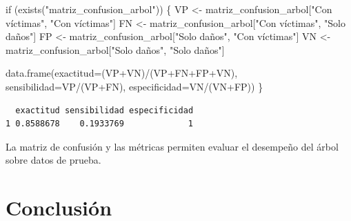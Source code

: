\documentclass[
  spanish,
  11pt,
  letterpaper,
]{book}
\newenvironment{Shaded}{}{}
\newcommand{\AttributeTok}[1]{\textcolor[rgb]{0.84,0.23,0.29}{#1}}
\newcommand{\ControlFlowTok}[1]{\textcolor[rgb]{0.84,0.23,0.29}{#1}}
\newcommand{\FunctionTok}[1]{\textcolor[rgb]{0.44,0.26,0.76}{#1}}
\newcommand{\NormalTok}[1]{\textcolor[rgb]{0.14,0.16,0.18}{#1}}
\newcommand{\OtherTok}[1]{\textcolor[rgb]{0.44,0.26,0.76}{#1}}
\newcommand{\SpecialCharTok}[1]{\textcolor[rgb]{0.00,0.36,0.77}{#1}}
\newcommand{\StringTok}[1]{\textcolor[rgb]{0.01,0.18,0.38}{#1}}
\begin{document}
\begin{Shaded}
\begin{Highlighting}[]
\ControlFlowTok{if}\NormalTok{ (}\FunctionTok{exists}\NormalTok{(}\StringTok{"matriz\_confusion\_arbol"}\NormalTok{)) \{}
\NormalTok{  VP }\OtherTok{\textless{}{-}}\NormalTok{ matriz\_confusion\_arbol[}\StringTok{"Con víctimas"}\NormalTok{, }\StringTok{"Con víctimas"}\NormalTok{]}
\NormalTok{  FN }\OtherTok{\textless{}{-}}\NormalTok{ matriz\_confusion\_arbol[}\StringTok{"Con víctimas"}\NormalTok{, }\StringTok{"Solo daños"}\NormalTok{]}
\NormalTok{  FP }\OtherTok{\textless{}{-}}\NormalTok{ matriz\_confusion\_arbol[}\StringTok{"Solo daños"}\NormalTok{, }\StringTok{"Con víctimas"}\NormalTok{]}
\NormalTok{  VN }\OtherTok{\textless{}{-}}\NormalTok{ matriz\_confusion\_arbol[}\StringTok{"Solo daños"}\NormalTok{, }\StringTok{"Solo daños"}\NormalTok{]}

  \FunctionTok{data.frame}\NormalTok{(}\AttributeTok{exactitud=}\NormalTok{(VP}\SpecialCharTok{+}\NormalTok{VN)}\SpecialCharTok{/}\NormalTok{(VP}\SpecialCharTok{+}\NormalTok{FN}\SpecialCharTok{+}\NormalTok{FP}\SpecialCharTok{+}\NormalTok{VN), }\AttributeTok{sensibilidad=}\NormalTok{VP}\SpecialCharTok{/}\NormalTok{(VP}\SpecialCharTok{+}\NormalTok{FN), }\AttributeTok{especificidad=}\NormalTok{VN}\SpecialCharTok{/}\NormalTok{(VN}\SpecialCharTok{+}\NormalTok{FP))}
\NormalTok{\}}
\end{Highlighting}
\end{Shaded}

\begin{verbatim}
  exactitud sensibilidad especificidad
1 0.8588678    0.1933769             1
\end{verbatim}

\begin{tcolorbox}[enhanced jigsaw, arc=.35mm, bottomrule=.15mm, bottomtitle=1mm, breakable, colback=white, colbacktitle=quarto-callout-tip-color!10!white, colframe=quarto-callout-tip-color-frame, coltitle=black, left=2mm, leftrule=.75mm, opacityback=0, opacitybacktitle=0.6, rightrule=.15mm, title=\textcolor{quarto-callout-tip-color}{\faLightbulb}\hspace{0.5em}{Interpretación del resultado}, titlerule=0mm, toprule=.15mm, toptitle=1mm]

La matriz de confusión y las métricas permiten evaluar el desempeño del
árbol sobre datos de prueba.

\end{tcolorbox}

\section{Conclusión}\label{conclusiuxf3n-4}
\end{document}

